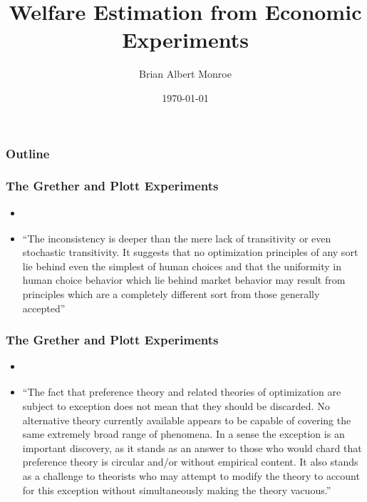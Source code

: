 \documentclass{beamer}
\title{Welfare Estimation from Economic Experiments}
\author{Brian Albert Monroe}
\date{\today}
\begin{document}
\begin{frame}
	\titlepage
\end{frame}

\begin{frame}
\frametitle{Outline}
\tableofcontents
\end{frame}

\begin{frame}
\frametitle{The Grether and Plott Experiments}
\begin{itemize}
	\item \textcite[624]{Grether1979}
	\item \enquote{The inconsistency is deeper than the mere lack of transitivity or even stochastic transitivity. It suggests that no optimization principles of any sort lie behind even the simplest of human choices and that the uniformity in human choice behavior which lie behind market behavior may result from principles which are a completely different sort from those generally accepted}
\end{itemize}
\end{frame}

\begin{frame}
\frametitle{The Grether and Plott Experiments}
\begin{itemize}
	\item \textcite[634]{Grether1979}
	\item \enquote{The fact that preference theory and related theories of optimization are subject to exception does not mean that they should be discarded. No alternative theory currently available appears to be capable of covering the same extremely broad range of phenomena. In a sense the exception is an important discovery, as it stands as an answer to those who would chard that preference theory is circular and/or without empirical content. It also stands as a challenge to theorists who may attempt to modify the theory to account for this exception without simultaneously making the theory vacuous.}
\end{itemize}
\end{frame}
\end{document}
